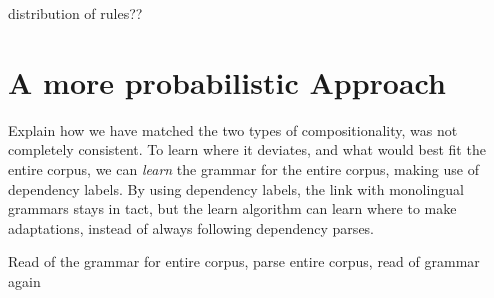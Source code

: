 \documentclass{report}
\begin{document}
distribution of rules??

\section{A more probabilistic Approach}

Explain how we have matched the two types of compositionality, was not completely consistent. To learn where it deviates, and what would best fit the entire corpus, we can \textit{learn} the grammar for the entire corpus, making use of dependency labels. By using dependency labels, the link with monolingual grammars stays in tact, but the learn algorithm can learn where to make adaptations, instead of always following dependency parses.

Read of the grammar for entire corpus, parse entire corpus, read of grammar again


\section{}









\end{document}
